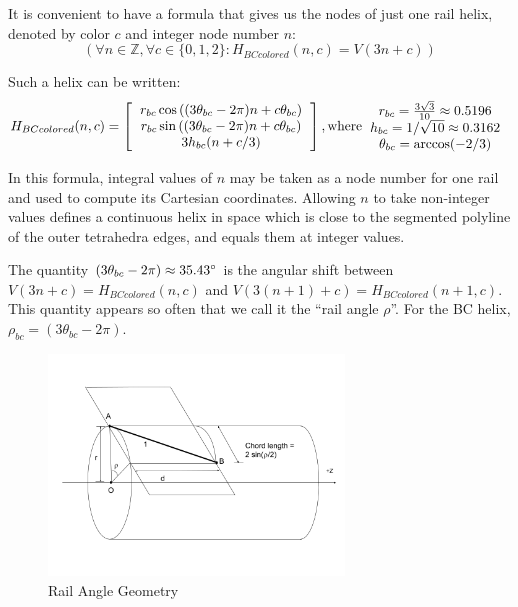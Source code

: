\documentclass[11pt]{article}
\begin{document}
It is convenient to have a formula that gives us the nodes of just
one rail helix, denoted by color $c$ and integer node number $n$:
\[
(\forall n \in \mathbb{Z}, \forall c \in \{0,1,2\} : H_{BCcolored}(n,c) = V(3n +c))
\]

Such a helix can be written:
\begin{equation}
  \label{eq:colored}
H_{BCcolored}(n,c) =
\left [
  \begin{tabular}{c}
   $ r_{bc}  \cos{((3 \theta_{bc} - 2 \pi)n + c  \theta_{bc})}  $\\
   $ r_{bc} \sin{((3 \theta_{bc} - 2 \pi)n + c  \theta_{bc})} $\\
   $ 3 h_{bc} (n + c/3)  $
  \end{tabular}
  \right ],
\text{where}
  \begin{tabular}{c}
 $ r_{bc} = \frac{3\sqrt{3}}{10} \approx 0.5196 $\\
 $ h_{bc} = 1/\sqrt{10} \approx 0.3162 $ \\
 $ \theta_{bc} = \arccos(-2/3) $ \\
  \end{tabular}      
\end{equation}

In this formula, integral values of $n$ may be taken as a node number for one rail and used to compute its Cartesian
coordinates. Allowing $n$ to take non-integer values defines a continuous
helix in space which is close to the segmented polyline of the outer tetrahedra edges, and equals them at integer
values.

The quantity $ (3 \theta_{bc} - 2 \pi) \approx 35.43 \degree $  is the angular shift between $V(3n+c)=H_{BCcolored}(n,c)$ and
$V(3(n+1)+c)=H_{BCcolored}(n+1,c)$.
This quantity appears so often that we call it the ``rail angle $\rho$''. For the BC helix, $\rho_{bc} = (3 \theta_{bc} - 2 \pi)$.

\begin{figure}[H]
     \centering
     \includegraphics[width=0.7\textwidth]{figures/RailAngleGeometry.png}
     \caption{Rail Angle Geometry}
  \label{railanglefig}
\end{figure}
\end{document}
